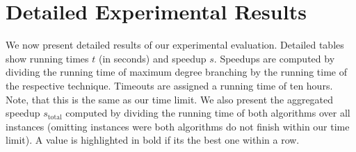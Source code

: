 \documentclass[a4paper,UKenglish,cleveref, autoref, thm-restate]{lipics-v2021}
\begin{document}
\section{Detailed Experimental Results}
\label{app:detailed_results}
We now present detailed results of our experimental evaluation. Detailed tables
show running times $t$ (in seconds) and speedup $s$.
Speedups are computed by dividing the running time of maximum degree branching by the running time of the respective technique.
Timeouts are assigned a running time of ten hours. Note, that this is the same as our time limit.
We also present the aggregated speedup $s_{\text{total}}$ computed by dividing the running time of both algorithms over all instances (omitting instances were both algorithms do not finish within our time limit).
A value is highlighted in bold if its the best one within a row.
\end{document}

